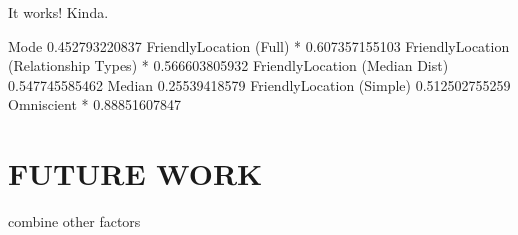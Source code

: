 \documentclass{sig-alternate}
\begin{document}
It works! Kinda.

Mode 0.452793220837
FriendlyLocation (Full) * 0.607357155103
FriendlyLocation (Relationship Types) * 0.566603805932
FriendlyLocation (Median Dist) 0.547745585462
Median 0.25539418579
FriendlyLocation (Simple) 0.512502755259
Omniscient * 0.88851607847


\section{FUTURE WORK}
combine other factors


 
\end{document}
